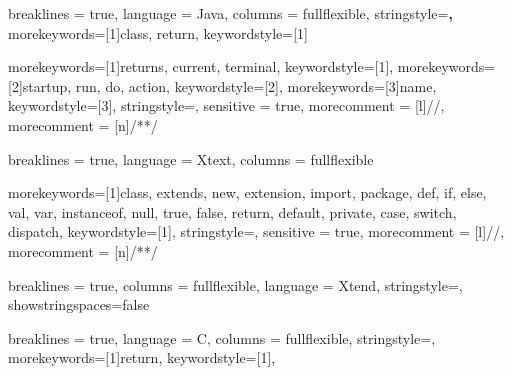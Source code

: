 
{
    breaklines = true,
    language = Java,
    columns = fullflexible,
    stringstyle=\color{eclipse_blue}\textbf,
    morekeywords=[1]{class, return}, 
    keywordstyle=[1]\color{eclipse_red}
}

\newcommand{\javacodeinline}[1]{\lstinline[style = java, basicstyle = \ttfamily\normalsize]{#1}}

{
    morekeywords=[1]{returns, current, terminal}, 
    keywordstyle=[1]\color{DarkOrchid},
    morekeywords=[2]{startup, run, do, action},
    keywordstyle=[2]\color{eclipse_blue},
    morekeywords=[3]{name},
    keywordstyle=[3]\color{red},
    stringstyle=\color{Goldenrod},
    sensitive = true,
    morecomment = [l]{//},
    morecomment = [n]{/*}{*/}
}

{
  breaklines = true,
  language = Xtext,
  columns = fullflexible
}

\newcommand{\xtextinline}[1]{\lstinline[style = xtext, basicstyle = \ttfamily\normalsize]{#1}}

{
    morekeywords=[1]{class, extends, new, extension, import, package, def, if, else, val, var, instanceof, null, true, false, return, default, private, case, switch, dispatch}, 
    keywordstyle=[1]\color{DarkOrchid},
    stringstyle=\color{eclipse_blue},
    sensitive = true,
    morecomment = [l]{//},
    morecomment = [n]{/*}{*/}
}

{
    breaklines = true,
    columns = fullflexible,
    language = Xtend,
    stringstyle=\color{eclipse_blue},
    showstringspaces=false
}

\newcommand{\xtendinline}[1]{\lstinline[style = xtend, basicstyle = \ttfamily\normalsize]{#1}}


{
    breaklines = true,
    language = C,
    columns = fullflexible,
    stringstyle=\color{eclipse_blue},
    morekeywords=[1]{return}, 
    keywordstyle=[1]\color{eclipse_red},
}

\newcommand{\cinline}[1]{\lstinline[style = c, basicstyle = \ttfamily\normalsize]{#1}}

